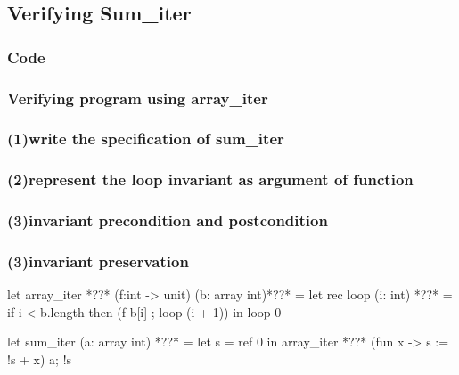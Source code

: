 \subsection*{Verifying Sum_iter}
\subsubsection*{Code}
\begin{frame}[fragile]
\frametitle<1>
{Verifying program using array\_iter}
\frametitle<2>
{(1)\quad write the specification of sum\_iter}
\frametitle<3>
{(2)\quad represent the loop invariant as argument of function}
\frametitle<4>
{(3)\quad invariant precondition and postcondition}
\frametitle<5>
{(3)\quad invariant preservation}


\begin{footnotesize}
\begin{minipage}[t]{0.3\linewidth}
\begin{whycode}  
   let array_iter  *??* (f:int -> unit) (b: array int)*??* 
   = let rec loop (i: int) *??*
      = if i < b.length 
       then (f b[i] ; loop (i + 1)) 
     in loop 0
   
   let sum_iter (a: array int) *??* 
   =  let s = ref 0 in
     array_iter *??* (fun x -> s := !s + x) a; 
     !s 
\end{whycode}
\end{minipage}
\end{footnotesize}
\end{frame}

